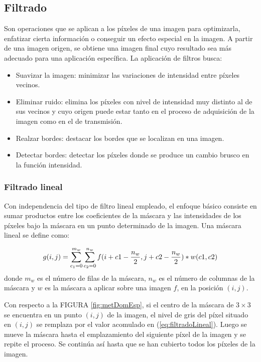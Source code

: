 \subsection{Filtrado}
Son operaciones que se aplican a los píxeles de una imagen para optimizarla, enfatizar cierta información o conseguir un efecto especial en la imagen.  
A partir de una imagen origen, se obtiene una imagen final cuyo resultado sea más adecuado para una aplicación específica.
La aplicación de filtros busca:
\begin{itemize}
\item Suavizar la imagen: minimizar las variaciones de intensidad entre píxeles vecinos.
\item Eliminar ruido: elimina los píxeles con nivel de intensidad muy distinto al de sus vecinos y cuyo origen puede estar tanto en el proceso de adquisición de la imagen como en el de transmisión.
\item Realzar bordes: destacar los bordes que se localizan en una imagen.
\item Detectar bordes: detectar los píxeles donde se produce un cambio brusco en la función intensidad.
\end{itemize}
 
\subsubsection{Filtrado lineal}
Con independencia del tipo de filtro lineal empleado, el enfoque básico
consiste en sumar productos entre los coeficientes de la máscara y las intensidades
de los píxeles bajo la máscara en un punto determinado de la imagen.
Una máscara lineal se define como:

\begin{equation}
\centering
\label{eq:filtradoLineal}
g(i,j)=\sum_{c_1=0}^{m_w} \sum_{c_2=0}^{n_w} f(i+c1-\frac{n_w}{2},j+c2-\frac{n_w}{2})*w(c1,c2)
\end{equation}
donde  $m_w$ es el número de filas de la máscara, $n_w$ es el número de columnas de la máscara y $w$ es la máscara a aplicar sobre una imagen $f$, en la posición $(i,j)$.

    Con respecto a la FIGURA \ref{fig:metDomEsp}, si el centro de la máscara de $ 3\times 3$ se encuentra en un
punto $(i,j)$ de la imagen, el nivel de gris del píxel situado en $(i,j)$ se remplaza
por el valor acomulado en  (\ref{eq:filtradoLineal}). Luego se mueve la máscara hasta el emplazamiento del siguiente píxel de la imagen y se repite el proceso. Se continúa así hasta que se
han cubierto todos los píxeles de la imagen.


